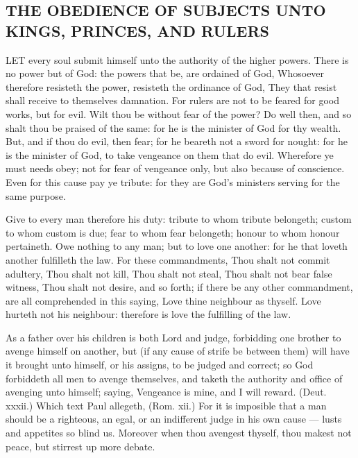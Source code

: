 \subsection*{THE OBEDIENCE OF SUBJECTS UNTO KINGS, PRINCES, AND RULERS}

LET every soul submit himself unto the authority of 
the higher powers. There is no power but of 
God: the powers that be, are ordained of God, Whosoever
therefore resisteth the power, resisteth the ordinance
of God, They that resist shall receive to themselves
damnation. For rulers are not to be feared for 
good works, but for evil. Wilt thou be without fear of 
the power? Do well then, and so shalt thou be praised 
of the same: for he is the minister of God for thy
wealth. But, and if thou do evil, then fear; for he 
beareth not a sword for nought: for he is the minister 
of God, to take vengeance on them that do evil. Wherefore
ye must needs obey; not for fear of vengeance only, 
but also because of conscience. Even for this cause pay 
ye tribute: for they are God's ministers serving for the 
same purpose. 

Give to every man therefore his duty: tribute to whom 
tribute belongeth; custom to whom custom is due; fear 
to whom fear belongeth; honour to whom honour pertaineth. 
Owe nothing to any man; but to love one another: for 
he that loveth another fulfilleth the law. For these commandments,
Thou shalt not commit adultery, Thou shalt 
not kill, Thou shalt not steal, Thou shalt not bear false witness,
Thou shalt not desire, and so forth; if there be any other 
commandment, are all comprehended in this saying, Love 
thine neighbour as thyself. Love hurteth not his neighbour:
therefore is love the fulfilling of the law. 

As a father over his children is both Lord and judge, 
forbidding one brother to avenge himself on another, but
(if any cause of strife be between them) will have it 
brought unto himself, or his assigns, to be judged and 
correct; so God forbiddeth all men to avenge themselves,
and taketh the authority and office of avenging unto 
himself; saying, Vengeance is mine, and I will reward. 
(Deut. xxxii.) Which text Paul allegeth, (Rom. xii.) 
For it is imposible that a man should be a righteous, an 
egal, or an indifferent judge in his own cause — lusts and 
appetites so blind us. Moreover when thou avengest 
thyself, thou makest not peace, but stirrest up more 
debate. 

